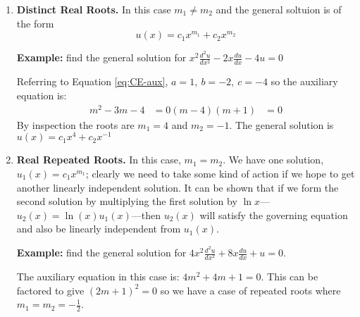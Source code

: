 \begin{enumerate}
\item \textbf{Distinct Real Roots.} In this case $m_1 \ne m_2$ and the general soltuion is of the form
\begin{equation}
u(x)=c_1x^{m_1}+c_2x^{m_2}
\end{equation}

\vspace{0.5cm}

\noindent\textbf{Example:} find the general solution for $x^2\frac{d^2u}{dx^2}-2x\frac{du}{dx}-4u=0$

\vspace{0.25cm}

\noindent Referring to Equation \ref{eq:CE-aux}, $a=1,\ b=-2, \ c=-4$ so the auxiliary equation is:
\begin{align*}
m^2-3m-4 &= 0
(m-4)(m+1) &=0
\end{align*}
By inspection the roots are $m_1=4$ and $m_2=-1$.  The general solution is $u(x)=c_1x^4+c_2x^{-1}$

\vspace{0.5cm}

\item \textbf{Real Repeated Roots.} In this case, $m_1 = m_2$.  We have one solution, $u_1(x)=c_1x^{m_1}$; clearly we need to take some kind of action if we hope to get another linearly independent solution.  It can be shown that if we form the second solution by multiplying the first solution by $\ln{x}$---$u_2(x)=\ln{(x)}u_1(x)$---then $u_2(x)$ will satisfy the governing equation and also be linearly independent from $u_1(x)$.

\vspace{0.5cm}

\noindent\textbf{Example:} find the general solution for $4x^2 \frac{d^2u}{dx^2}+8x\frac{du}{dx}+u=0$.

\vspace{0.25cm}

\noindent The auxiliary equation in this case is: $4m^2+4m+1=0$.  This can be factored to give $(2m+1)^2=0$ so we have a case of repeated roots where $m_1=m_2=-\frac{1}{2}$.


\end{enumerate}
